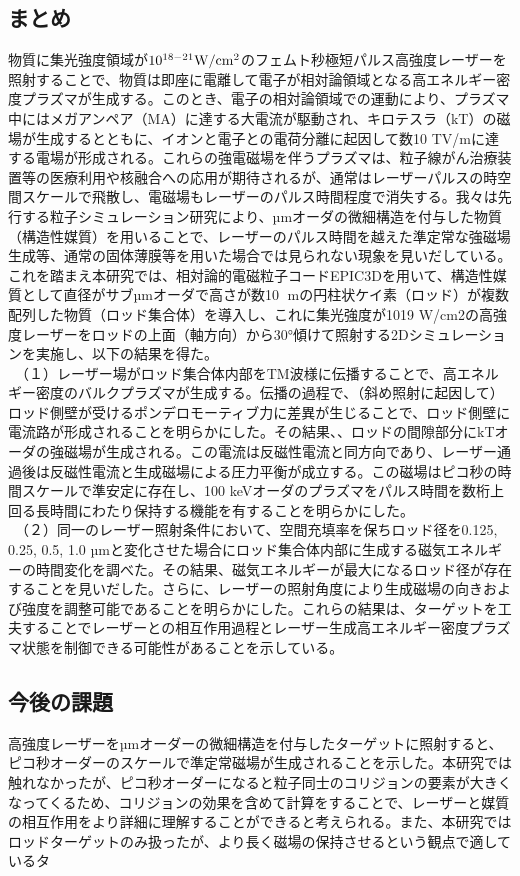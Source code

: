 \documentclass[a4paper,11pt,titlepage]{jarticle}
\numberwithin{equation}{section} %
\begin{document}
\subsection{まとめ}
物質に集光強度領域が$10^{18-21} \rm{W}/ \rm{cm}^2$のフェムト秒極短パルス高強度レーザーを照射することで、物質は即座に電離して電子が相対論領域となる高エネルギー密度プラズマが生成する。このとき、電子の相対論領域での運動により、プラズマ中にはメガアンペア（MA）に達する大電流が駆動され、キロテスラ（kT）の磁場が生成するとともに、イオンと電子との電荷分離に起因して数10 TV/mに達する電場が形成される。これらの強電磁場を伴うプラズマは、粒子線がん治療装置等の医療利用や核融合への応用が期待されるが、通常はレーザーパルスの時空間スケールで飛散し、電磁場もレーザーのパルス時間程度で消失する。我々は先行する粒子シミュレーション研究により、µmオーダの微細構造を付与した物質（構造性媒質）を用いることで、レーザーのパルス時間を越えた準定常な強磁場生成等、通常の固体薄膜等を用いた場合では見られない現象を見いだしている。これを踏まえ本研究では、相対論的電磁粒子コードEPIC3D\cite{m4}を用いて、構造性媒質として直径がサブµmオーダで高さが数10 mの円柱状ケイ素（ロッド）が複数配列した物質（ロッド集合体）を導入し、これに集光強度が1019 W/cm2の高強度レーザーをロッドの上面（軸方向）から30°傾けて照射する2Dシミュレーションを実施し、以下の結果を得た。\\
　（１）レーザー場がロッド集合体内部をTM波様に伝播することで、高エネルギー密度のバルクプラズマが生成する。伝播の過程で、（斜め照射に起因して）ロッド側壁が受けるポンデロモーティブ力に差異が生じることで、ロッド側壁に電流路が形成されることを明らかにした。その結果、、ロッドの間隙部分にkTオーダの強磁場が生成される。この電流は反磁性電流と同方向であり、レーザー通過後は反磁性電流と生成磁場による圧力平衡が成立する。この磁場はピコ秒の時間スケールで準安定に存在し、100 keVオーダのプラズマをパルス時間を数桁上回る長時間にわたり保持する機能を有することを明らかにした。\\
　（２）同一のレーザー照射条件において、空間充填率を保ちロッド径を0.125, 0.25, 0.5, 1.0 µmと変化させた場合にロッド集合体内部に生成する磁気エネルギーの時間変化を調べた。その結果、磁気エネルギーが最大になるロッド径が存在することを見いだした。さらに、レーザーの照射角度により生成磁場の向きおよび強度を調整可能であることを明らかにした。これらの結果は、ターゲットを工夫することでレーザーとの相互作用過程とレーザー生成高エネルギー密度プラズマ状態を制御できる可能性があることを示している。


\subsection{今後の課題}
高強度レーザーをµmオーダーの微細構造を付与したターゲットに照射すると、ピコ秒オーダーのスケールで準定常磁場が生成されることを示した。本研究では触れなかったが、ピコ秒オーダーになると粒子同士のコリジョンの要素が大きくなってくるため、コリジョンの効果を含めて計算をすることで、レーザーと媒質の相互作用をより詳細に理解することができると考えられる。また、本研究ではロッドターゲットのみ扱ったが、より長く磁場の保持させるという観点で適しているタ
\end{document}
